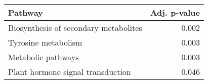 \begin{tabular}{lr}
\toprule
                               Pathway &  Adj. p-value \\
\midrule
 Biosynthesis of secondary metabolites &         0.002 \\
                   Tyrosine metabolism &         0.003 \\
                    Metabolic pathways &         0.003 \\
     Plant hormone signal transduction &         0.046 \\
\bottomrule
\end{tabular}
